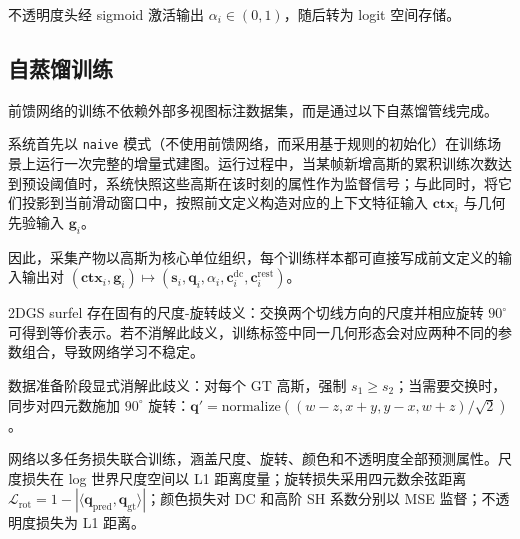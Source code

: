 不透明度头经 sigmoid 激活输出 $\alpha_i \in (0,1)$，随后转为 logit 空间存储。

\subsection{自蒸馏训练}

前馈网络的训练不依赖外部多视图标注数据集，而是通过以下自蒸馏管线完成。

系统首先以 \texttt{naive} 模式（不使用前馈网络，而采用基于规则的初始化）在训练场景上运行一次完整的增量式建图。运行过程中，当某帧新增高斯的累积训练次数达到预设阈值时，系统快照这些高斯在该时刻的属性作为监督信号；与此同时，将它们投影到当前滑动窗口中，按照前文定义构造对应的上下文特征输入 $\mathbf{ctx}_i$ 与几何先验输入 $\mathbf{g}_i$。

因此，采集产物以高斯为核心单位组织，每个训练样本都可直接写成前文定义的输入输出对 $(\mathbf{ctx}_i, \mathbf{g}_i) \mapsto (\mathbf{s}_i, \mathbf{q}_i, \alpha_i, \mathbf{c}_i^{\mathrm{dc}}, \mathbf{c}_i^{\mathrm{rest}})$。

2DGS surfel 存在固有的尺度-旋转歧义：交换两个切线方向的尺度并相应旋转 $90^\circ$ 可得到等价表示。若不消解此歧义，训练标签中同一几何形态会对应两种不同的参数组合，导致网络学习不稳定。

数据准备阶段显式消解此歧义：对每个 GT 高斯，强制 $s_1 \geq s_2$；当需要交换时，同步对四元数施加 $90^\circ$ 旋转：$\mathbf{q}' = \text{normalize}((w-z, x+y, y-x, w+z) / \sqrt{2})$。

网络以多任务损失联合训练，涵盖尺度、旋转、颜色和不透明度全部预测属性。尺度损失在 log 世界尺度空间以 L1 距离度量；旋转损失采用四元数余弦距离 $\mathcal{L}_{\text{rot}} = 1 - |\langle \mathbf{q}_{\text{pred}}, \mathbf{q}_{\text{gt}} \rangle|$；颜色损失对 DC 和高阶 SH 系数分别以 MSE 监督；不透明度损失为 L1 距离。
